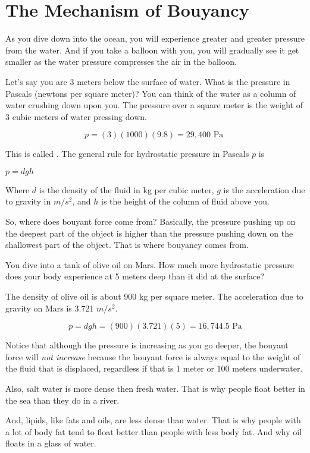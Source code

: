 \section{The Mechanism of Bouyancy}

As you dive down into the ocean, you will experience greater and
greater pressure from the water. And if you take a balloon with you, you
will gradually see it get smaller as the water pressure compresses the
air in the balloon.

Let's say you are 3 meters below the surface of water. What is the
pressure in Pascals (newtons per square meter)? You can think of the
water as a column of water crushing down upon you. The pressure over
a square meter is the weight of 3 cubic meters of water pressing down.

$$p = (3)(1000)(9.8) = 29,400 \text{ Pa }$$

This is called . The general rule for
hydrostatic pressure in Pascals $p$ is

$p = d g h$

Where  $d$ is the density of the fluid
in kg per cubic meter, $g$ is the acceleration due to gravity in
$m/s^2$, and $h$ is the height of the column of fluid above you.

So, where does bouyant force come from? Basically, the pressure pushing up on the
deepest part of the object is higher than the pressure pushing down on
the shallowest part of the object. That is where bouyancy comes from.

\begin{Exercise}[title={Hydrostatic Pressure}, label=mars_pressure]

  You dive into a tank of olive oil on Mars. How much more
  hydrostatic pressure does your body experience at 5 meters deep than
  it did at the surface?

  The density of olive oil is about 900 kg per square meter. The
  acceleration due to gravity on Mars is 3.721 $m/s^2$.
  
\end{Exercise}
\begin{Answer}[ref=mars_pressure]
$$p = d g h = (900)(3.721)(5) = 16,744.5 \text{ Pa}$$
\end{Answer}

Notice that although the pressure is increasing as you go deeper, the
bouyant force will \emph{not increase} because the bouyant force is always equal
to the weight of the fluid that is displaced, regardless if that is 1
meter or 100 meters underwater.

Also, salt water is more dense then fresh water. That is why people float
better in the sea than they do in a river.

And, lipids, like fats and oils, are less dense than water. That is why
people with a lot of body fat tend to float better than people with
less body fat. And why oil floats in a glass of water.
